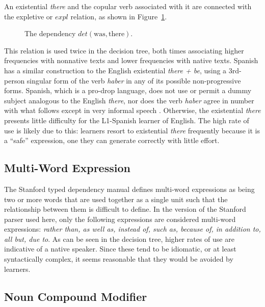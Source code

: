 \documentclass[main.tex]{subfiles}
\begin{document}
An existential \textit{there} and the copular verb associated with it are connected with the expletive or $expl$ relation, as shown in Figure~\ref{ex:expl}. 
\begin{figure}[ht]
\centering
{}
\caption{The dependency $det(\text{was},\text{there})$. \citep[Ch. 3.29]{quirk:1985}}
\label{ex:expl}
\end{figure}
This relation is used twice in the decision tree, both times associating higher frequencies with nonnative texts and lower frequencies with native texts. Spanish has a similar construction to the English existential \textit{there + be}, using a 3rd-person singular form of the verb \textit{haber} in any of its possible non-progressive forms. Spanish, which is a pro-drop language, does not use or permit a dummy subject analogous to the English \textit{there}, nor does the verb \textit{haber} agree in number with what follows except in very informal speech \citep[Ch. 30]{butt}. Otherwise, the existential \textit{there} presents little difficulty for the L1-Spanish learner of English. The high rate of use is likely due to this: learners resort to existential \textit{there} frequently because it is a ``safe'' expression, one they can generate correctly with little effort.

\subsection{Multi-Word Expression}

The Stanford typed dependency manual \citep{typed-deps-manual} defines multi-word expressions as being two or more words that are used together as a single unit such that the relationship between them is difficult to define. In the version of the Stanford parser used here, only the following expressions are considered multi-word expressions: \textit{rather than, as well as, instead of, such as, because of, in addition to, all but, due to}. As can be seen in the decision tree, higher rates of use are indicative of a native speaker. Since these tend to be idiomatic, or at least syntactically complex, it seems reasonable that they would be avoided by learners.

\subsection{Noun Compound Modifier}
\label{sub:nn}
\end{document}
